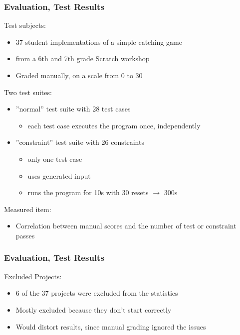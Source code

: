 \begin{frame}
\end{frame}

\begin{frame}
\end{frame}

\begin{frame}\frametitle{Evaluation, Test Results}
    Test subjects:
    \begin{itemize}
        \item \textcolor{upfim}{37 student implementations} of a simple catching game
        \item from a 6th and 7th grade Scratch workshop~\cite{keller}
        \item Graded manually, on a scale from 0 to 30
    \end{itemize}

    \pause
    \bigskip

    Two test suites:
    \begin{itemize}
        \item \textcolor{upfim}{''normal'' test suite} with 28 test cases
            \begin{itemize}
                \item each test case executes the program once, independently
            \end{itemize}
        \item \textcolor{upfim}{''constraint'' test suite} with 26 constraints
            \begin{itemize}
                \item only one test case
                \item uses generated input
                \item runs the program for 10s with 30 resets $\rightarrow$ 300s
            \end{itemize}
    \end{itemize}

    \pause
    \bigskip

    Measured item:
    \begin{itemize}
        \item Correlation between manual scores and the number of test or constraint passes
    \end{itemize}
\end{frame}

\begin{frame}\frametitle{Evaluation, Test Results}
    Excluded Projects:
    \begin{itemize}
        \item 6 of the 37 projects were excluded from the statistics
        \item Mostly excluded because they don't start correctly
        \item Would distort results, since manual grading ignored the issues
    \end{itemize}

\end{frame}

